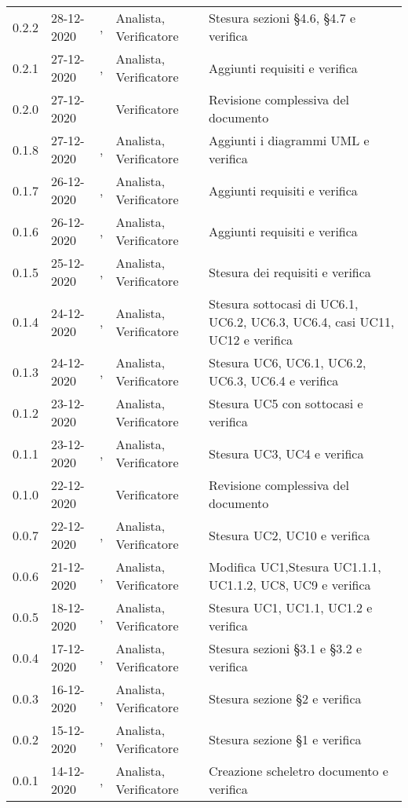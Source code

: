{{\begin{longtable}{C{1.7cm} | C{2.5cm} | C{3.2cm} | C{2.7cm}  | C{4.8cm}}
0.2.2 & 28-12-2020 & \BM{}, \RA{} & Analista, Verificatore & Stesura sezioni §4.6, §4.7 e verifica\\
0.2.1 & 27-12-2020 & \SG{}, \RA{} & Analista, Verificatore & Aggiunti requisiti e verifica\\

0.2.0 & 27-12-2020 & \RA{} & Verificatore & Revisione complessiva del documento \\

0.1.8 & 27-12-2020 & \SP{}, \RA{} & Analista, Verificatore & Aggiunti i diagrammi UML e verifica\\
0.1.7 & 26-12-2020 & \SP{}, \PA{} & Analista, Verificatore & Aggiunti requisiti e verifica\\
0.1.6 & 26-12-2020 & \BM{}, \PA{} & Analista, Verificatore & Aggiunti requisiti e verifica\\
0.1.5 & 25-12-2020 & \SG{}, \PA{} & Analista, Verificatore & Stesura dei requisiti  e verifica\\
0.1.4 & 24-12-2020 & \SP{}, \RA{} & Analista, Verificatore & Stesura sottocasi di UC6.1, UC6.2, UC6.3, UC6.4, casi UC11, UC12 e verifica\\
0.1.3 & 24-12-2020 & \SG{}, \RA{} & Analista, Verificatore & Stesura UC6, UC6.1, UC6.2, UC6.3, UC6.4 e verifica\\
0.1.2 & 23-12-2020 & \SP{, \RA{}} & Analista, Verificatore & Stesura UC5 con sottocasi e verifica\\

0.1.1 & 23-12-2020 & \BM{}, \RA{} & Analista, Verificatore & Stesura UC3, UC4 e verifica\\

0.1.0 & 22-12-2020 & \PA{} & Verificatore & Revisione complessiva del documento \\

0.0.7 & 22-12-2020 & \SG{}, \PA{} & Analista, Verificatore & Stesura UC2, UC10 e verifica\\
0.0.6 & 21-12-2020 & \BM{}, \PA{} & Analista, Verificatore & Modifica UC1,\newline Stesura UC1.1.1, UC1.1.2, UC8, UC9 e verifica\\
0.0.5 & 18-12-2020 & \SP{}, \RA{} & Analista, Verificatore & Stesura UC1, UC1.1, UC1.2 e verifica\\
0.0.4 & 17-12-2020 & \SP{}, \RA{} & Analista, Verificatore & Stesura sezioni §3.1 e §3.2 e verifica\\	
0.0.3 & 16-12-2020 & \SP{}, \PA{} & Analista, Verificatore & Stesura sezione §2 e verifica\\
0.0.2 & 15-12-2020 & \SP{}, \PA{} & Analista, Verificatore & Stesura sezione §1 e verifica\\
0.0.1 & 14-12-2020 & \SP{}, \PA{} & Analista, Verificatore & Creazione scheletro documento e verifica\\
		
\end{longtable}
}
}

